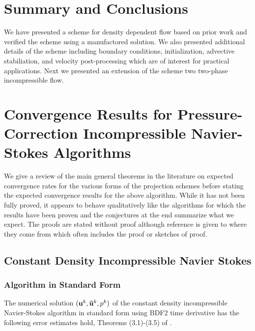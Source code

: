 \documentclass[letterpaper]{erdc}
\begin{document}
\chapter{Summary and Conclusions}

We have presented a scheme for density dependent flow based on prior
work and verified the scheme using a manufactored solution. We also
presented additional details of the scheme including boundary
conditions, initialization, advective stabiliation, and velocity
post-processing which are of interest for practical applications. Next
we presented an extension of the scheme two two-phase incompressible
flow.

%
%
%






\appendix


%
%
%
%
\chapter{Convergence Results for Pressure-Correction Incompressible Navier-Stokes Algorithms}\label{ch:LiteratureReview}
We give a review of the main general theorems in the literature on expected convergence rates for the various forms of the projection schemes before stating the expected convergence results for the above algorithm.  While it has not been fully proved, it appears to behave qualitatively like the algorithms for which the results have been proven and the conjectures at the end summarize what we expect.  The proofs are stated without proof although reference is given to where they come from which often includes the proof or sketches of proof.

%
%
%
\section{Constant Density Incompressible Navier Stokes}

%
%
\subsection{Algorithm in Standard Form}
The numerical solution $(\textbf{u}^k, \mathbf{\tilde{u}}^k,p^k)$ of the constant density incompressible Navier-Stokes algorithm in standard form using BDF2 time derivative has the following error estimates hold, Theorems (3.1)-(3.5) of \cite{guermond1997resultat}.
\end{document}
